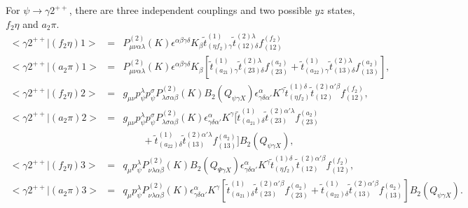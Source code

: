  For $\psi\to\gamma 2^{++}$, there are three independent
couplings and two possible $yz$ states, $f_2\eta$ and $a_2\pi$.
\begin{eqnarray}
<\gamma 2^{++}|(f_2\eta)1> \!&=&\!
P^{(2)}_{\mu\nu\alpha\lambda}(K)
\epsilon^{\alpha\beta\gamma\delta}K_{\beta} \tilde t^{(1)}_{(\eta
f_2)\gamma}\tilde t_{(12)\delta}^{(2)\lambda}f_{(12)}^{(f_2)}\\
<\gamma 2^{++}|(a_2\pi)1> \!&=&\! P^{(2)}_{\mu\nu\alpha\lambda}(K)
\epsilon^{\alpha\beta\gamma\delta}K_\beta [\tilde
t^{(1)}_{(a_21)\gamma}\tilde t_{(23)\delta}^{(2)\lambda}
f_{(23)}^{(a_2)} + \tilde t^{(1)}_{(a_22)\gamma}\tilde
t_{(13)\delta}^{(2)\lambda} f_{(13)}^{(a_2)}],\\
<\gamma 2^{++}|(f_2\eta)2> \!&=&\! g_{\mu\nu}p_\psi^\lambda
p_\psi^\sigma P^{(2)}_{\lambda\sigma\alpha\beta}(K)
B_2(Q_{\psi\gamma X}) \epsilon^\alpha_{\gamma\delta\alpha'}
K^\gamma \tilde t^{(1)\delta}_{(\eta f_2)}\tilde
t_{(12)}^{(2)\alpha'\beta}f_{(12)}^{(f_2)},   \\
<\gamma 2^{++}|(a_2\pi)2> \!&=&\! g_{\mu\nu}p_\psi^\lambda
p_\psi^\sigma P^{(2)}_{\lambda\sigma\alpha\beta}(K)
\epsilon^\alpha_{\gamma\delta\alpha'} K^\gamma [\tilde
t^{(1)}_{(a_21)\delta}\tilde
t_{(23)}^{(2)\alpha'\lambda} f_{(23)}^{(a_2)} \nonumber\\
&&\quad\quad +\tilde t^{(1)}_{(a_22)\delta}\tilde
t_{(13)}^{(2)\alpha'\lambda}f_{(13)}^{(a_2)}]B_2(Q_{\psi\gamma X}),\\
<\gamma 2^{++}|(f_2\eta)3> \!&=&\! q_\mu
p_\psi^{\lambda}P^{(2)}_{\nu\lambda\alpha\beta}(K)
B_2(Q_{\Psi\gamma X})
\epsilon^\alpha_{\gamma\delta\alpha'}K^\gamma \tilde
t^{(1)\delta}_{(\eta f_2)}\tilde
t_{(12)}^{(2)\alpha'\beta}f_{(12)}^{(f_2)},\\
<\gamma 2^{++}|(a_2\pi)3> \!&=&\!   q_\mu
p_\psi^{\lambda}P^{(2)}_{\nu\lambda\alpha\beta}(K)
\epsilon^\alpha_{\gamma\delta\alpha'}K^\gamma [\tilde
t^{(1)}_{(a_21)\delta}\tilde t_{(23)}^{(2)\alpha'\beta}
f_{(23)}^{(a_2)} %
+\tilde t^{(1)}_{(a_22)\delta}\tilde
t_{(13)}^{(2)\alpha'\beta}f_{(13)}^{(a_2)}]B_2(Q_{\psi\gamma X}).
\nonumber\\
\end{eqnarray}


